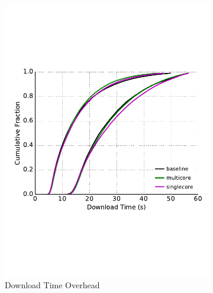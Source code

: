 \begin{figure} \centering
	\begin{subfigure}[t]{0.32\textwidth} \centering
\includegraphics[trim={0 3cm 0 3cm}, clip, width=1.0\textwidth]{images/overhead_downloadtime.pdf}
		\caption{Download Time Overhead}
		\label{fig:overhead_ttlastbyte}
	\end{subfigure}
	\begin{subfigure}[t]{0.32\textwidth} \centering

\end{subfigure}
\end{figure}

